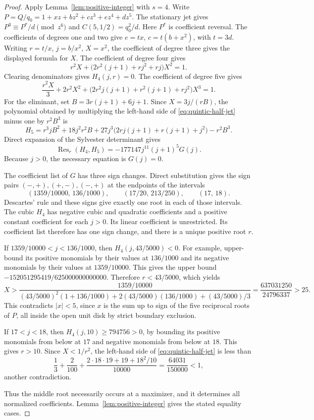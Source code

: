 \documentclass[11pt]{article}
\begin{document}
\begin{proof}
Apply Lemma~\ref{lem:positive-integer} with \(s=4\).
Write \(P=Q/q_0=1+xz+bz^2+cz^3+ez^4+dz^5\).
The stationary jet gives
\(P^3\equiv P^*/d\pmod{z^6}\) and \(C(5,1/2)=q_0^2/d\).
Here \(P^*\) is coefficient reversal. The coefficients of degrees
one and two give \(e=tx\), \(c=t(b+x^2)\), with \(t=3d\).
Writing \(r=t/x\), \(j=b/x^2\), \(X=x^2\), the coefficient of
degree three gives the displayed formula for \(X\).
The coefficient of degree four gives
\[
 r^2X+\bigl(2r^2(j+1)+rj^2+rj\bigr)X^2=1 .
\]
Clearing denominators gives \(H_4(j,r)=0\).
The coefficient of degree five gives
\begin{equation}\label{eq:quintic-half-jet}
 \frac{r^2X}{3}+2r^2X^2+
   \bigl(2r^2j(j+1)+r^2(j+1)+rj^2\bigr)X^3=1.
\end{equation}
For the eliminant, set \(B=3r(j+1)+6j+1\).
Since \(X=3j/(rB)\), the polynomial obtained by multiplying the
left-hand side of \eqref{eq:quintic-half-jet} minus one by
\(r^2 B^3\) is
\[
 H_5=r^3jB^2+18j^2r^2 B+
     27j^3\bigl(2rj(j+1)+r(j+1)+j^2\bigr)-r^2B^3 .
\]
Direct expansion of the Sylvester determinant gives
\[
 \operatorname{Res}_r(H_4,H_5)
          =-177147j^{11}(j+1)^5G(j).
\]
Because \(j>0\), the necessary equation is \(G(j)=0\).

The coefficient list of \(G\) has three sign changes. Direct
substitution gives the sign pairs \((-,+),(+,-),(-,+)\) at the
endpoints of the intervals
\[
 (1359/10000,\,136/1000),\qquad
 (17/20,\,213/250),\qquad
 (17,\,18).
\]
Descartes' rule and these signs give exactly one root in each of
those intervals. The cubic \(H_4\) has negative cubic and
quadratic coefficients and a positive constant coefficient for
each \(j>0\). Its linear coefficient is unrestricted.
Its coefficient list therefore has one sign change, and there is
a unique positive root \(r\).

If \(1359/10000<j<136/1000\), then \(H_4(j,43/5000)<0\).
For example, upper-bound its positive monomials by their values
at \(136/1000\) and its negative monomials by their values at
\(1359/10000\). This gives the upper bound
\(-152051295419/625000000000000\). Therefore \(r<43/5000\),
which yields
\[
 X>\frac{1359/10000}
  {(43/5000)^2(1+136/1000)+2(43/5000)(136/1000)+(43/5000)/3}
 =\frac{637031250}{24796337}>25.
\]
This contradicts \(|x|<5\), since \(x\) is the sum up to sign of
the five reciprocal roots of \(P\), all inside the open unit disk
by strict boundary exclusion.

If \(17<j<18\), then \(H_4(j,10)\ge794756>0\), by bounding its
positive monomials from below at \(17\) and negative monomials
from below at \(18\). This gives \(r>10\). Since \(X<1/r^2\), the
left-hand side of \eqref{eq:quintic-half-jet} is less than
\[
 \frac13+\frac2{100}
  +\frac{2\cdot 18\cdot19+19+18^2/10}{10000}
 =\frac{64031}{150000}<1,
\]
another contradiction.

Thus the middle root necessarily occurs at a maximizer, and it
determines all normalized coefficients. Lemma~\ref{lem:positive-integer} gives the stated equality cases.
\end{proof}
\end{document}
